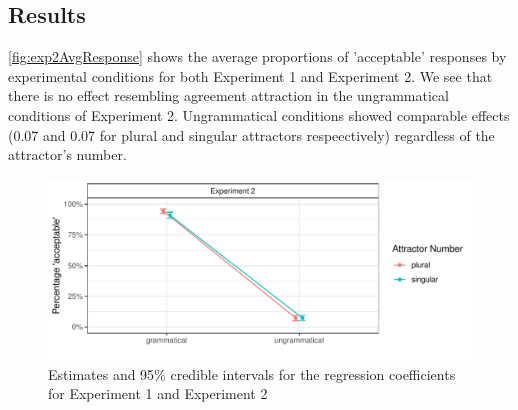 \documentclass[doc,a4paper,man,natbib,floatsintext,noextraspace]{apa6}\usepackage[]{graphicx}\usepackage[]{color}
\makeatletter
\def\maxwidth{ %
  \ifdim\Gin@nat@width>\linewidth
    \linewidth
  \else
    \Gin@nat@width
  \fi
}
\newenvironment{knitrout}{}{} %
\makeatother
\begin{document}

\subsection{Results} \label{sec:exp2:results}

\autoref{fig:exp2AvgResponse} shows the average proportions of 'acceptable' responses by experimental conditions for both Experiment 1 and Experiment 2. We see that there is no effect resembling agreement attraction in the ungrammatical conditions of Experiment 2. Ungrammatical conditions showed comparable effects (0.07 and 0.07 for plural and singular attractors respeectively) regardless of the attractor's number.  



\begin{knitrout}
\color{fgcolor}\begin{figure}

{\centering \includegraphics[width=\maxwidth]{figure/exp2AvgResponse-1} 

}

\caption[Estimates and 95\% credible intervals for the regression coefficients for Experiment 1 and Experiment 2]{Estimates and 95\% credible intervals for the regression coefficients for Experiment 1 and Experiment 2}\label{fig:exp2AvgResponse}
\end{figure}


\end{knitrout}
\end{document}
